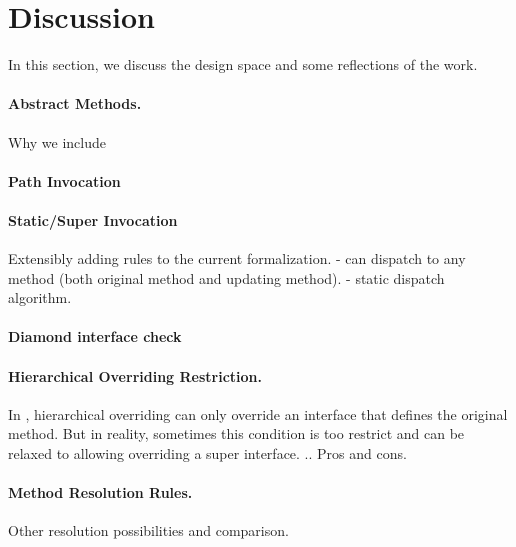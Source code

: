 \section{Discussion}
In this section, we discuss the design space and some reflections of the work. 
\paragraph{Abstract Methods.}
Why we include 
\paragraph{Path Invocation}

\paragraph{Static/Super Invocation}
Extensibly adding rules to the current formalization.
- can dispatch to any method (both original method and updating method).
- static dispatch algorithm.

\paragraph{Diamond interface check}

\paragraph{Hierarchical Overriding Restriction.}
In \MIM{}, hierarchical overriding can only override an interface that defines the original method. But in reality, sometimes this condition is too restrict and can be relaxed to allowing overriding a super interface. .. Pros and cons.

\paragraph{Method Resolution Rules.}
Other resolution possibilities and comparison.